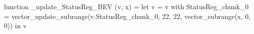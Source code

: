 function _update_StatusReg_BEV (v, x) = let v = { v with StatusReg_chunk_0 = vector_update_subrange(v.StatusReg_chunk_0, 22, 22, vector_subrange(x, 0, 0)) } in v
